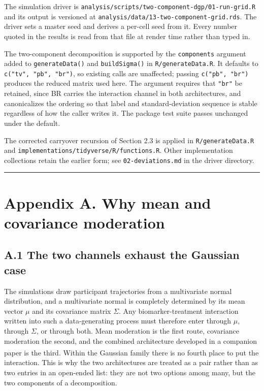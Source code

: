 \documentclass[
  11pt,
]{article}
\begin{document}
The simulation driver is
\texttt{analysis/scripts/two-component-dgp/01-run-grid.R} and its
output is versioned at
\texttt{analysis/data/13-two-component-grid.rds}. The driver sets a
master seed and derives a per-cell seed from it. Every number quoted
in the results is read from that file at render time rather than
typed in.

The two-component decomposition is supported by the
\texttt{components} argument added to \texttt{generateData()} and
\texttt{buildSigma()} in \texttt{R/generateData.R}. It defaults to
\texttt{c("tv", "pb", "br")}, so existing calls are unaffected;
passing \texttt{c("pb", "br")} produces the reduced matrix used here.
The argument requires that \texttt{"br"} be retained, since BR
carries the interaction channel in both architectures, and
canonicalizes the ordering so that label and standard-deviation
sequence is stable regardless of how the caller writes it. The
package test suite passes unchanged under the default.

The corrected carryover recursion of Section 2.3 is applied in
\texttt{R/generateData.R} and
\texttt{implementations/tidyverse/R/functions.R}. Other
implementation collections retain the earlier form; see
\texttt{02-deviations.md} in the driver directory.

\bigskip\noindent

\rule{\textwidth}{0.4pt}\bigskip

\section{Appendix A. Why mean and covariance moderation}

\subsection{A.1 The two channels exhaust the Gaussian case}

The simulations draw participant trajectories from a multivariate
normal distribution, and a multivariate normal is completely
determined by its mean vector \(\mu\) and its covariance matrix
\(\Sigma\). Any biomarker-treatment interaction written into such a
data-generating process must therefore enter through \(\mu\), through
\(\Sigma\), or through both. Mean moderation is the first route,
covariance moderation the second, and the combined architecture
developed in a companion paper\textsuperscript{} is the third.
Within the Gaussian family there is no fourth place to put the
interaction. This is why the two architectures are treated as a pair
rather than as two entries in an open-ended list: they are not two
options among many, but the two components of a decomposition.
\end{document}
